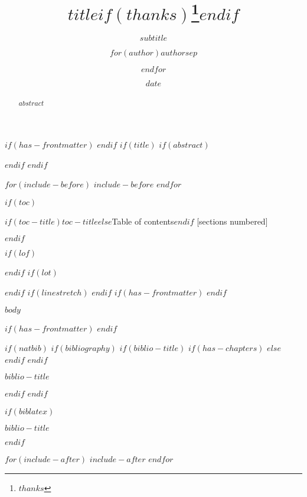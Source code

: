 \documentclass[
$if(fontsize)$
   $fontsize$,
$endif$
$if(lang)$
   $babel-lang$,
$endif$
$if(papersize)$
   $papersize$paper,
$endif$
$for(classoption)$
  $classoption$$sep$,
$endfor$
]{beamer}
\title{$title$$if(thanks)$\thanks{$thanks$}$endif$}
\subtitle{$subtitle$}
\author{$for(author)$$author$$sep$ \and $endfor$}
\date{$date$}
\institute{$for(institute)$$institute$$sep$ \and $endfor$}
\newif\ifbibliography
\begin{document}
$if(has-frontmatter)$
\frontmatter
$endif$
$if(title)$
\frame{\titlepage}
   $if(abstract)$
\begin{abstract}
         $abstract$
\end{abstract}
   $endif$
$endif$

$for(include-before)$
   $include-before$
$endfor$

$if(toc)$
\begin{frame}{$if(toc-title)$$toc-title$$else$Table of contents$endif$}
   [sections numbered]
   \tableofcontents[hideallsubsections]
\end{frame}
$endif$

$if(lof)$
\listoffigures
$endif$
$if(lot)$
\listoftables
$endif$
$if(linestretch)$
$endif$
$if(has-frontmatter)$
\mainmatter
$endif$

$body$

$if(has-frontmatter)$
\backmatter
$endif$

$if(natbib)$
   $if(bibliography)$
      $if(biblio-title)$
         $if(has-chapters)$
\renewcommand\bibname{$biblio-title$}
         $else$
\renewcommand\refname{$biblio-title$}
         $endif$
      $endif$
\begin{frame}[allowframebreaks]{$biblio-title$}
   \bibliographytrue
   
\end{frame}
   $endif$
$endif$

$if(biblatex)$
\begin{frame}[allowframebreaks]{$biblio-title$}
   \bibliographytrue
   \printbibliography[heading=none]
\end{frame}
$endif$

$for(include-after)$
   $include-after$
$endfor$
\end{document}
